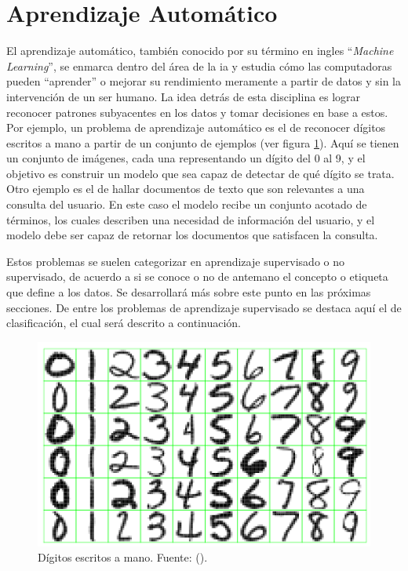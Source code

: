 \section{Aprendizaje Automático}

El aprendizaje automático, también conocido por su término en ingles
“\textit{Machine Learning}”, se enmarca dentro del área de la \acrfull{ia} y
estudia cómo las computadoras pueden “aprender” o mejorar su rendimiento
meramente a partir de datos y sin la intervención de un ser humano.  La idea
detrás de esta disciplina es lograr reconocer patrones subyacentes en los datos
y tomar decisiones en base a estos. Por ejemplo, un problema de aprendizaje
automático es el de reconocer dígitos escritos a mano a partir de un conjunto de
ejemplos (ver figura \ref{fig:reconocimiento_digitos}).  Aquí se tienen un
conjunto de imágenes, cada una representando un dígito del 0 al 9, y el objetivo
es construir un modelo que sea capaz de detectar de qué dígito se trata. Otro
ejemplo es el de hallar documentos de texto que son relevantes a una consulta
del usuario. En este caso el modelo recibe un conjunto acotado de términos, los
cuales describen una necesidad de información del usuario, y el modelo debe ser
capaz de retornar los documentos que satisfacen la consulta.  

Estos problemas se suelen categorizar en aprendizaje supervisado o no
supervisado, de acuerdo a si se conoce o no de antemano el concepto o etiqueta
que define a los datos. Se desarrollará más sobre este punto en las próximas
secciones. De entre los problemas de aprendizaje supervisado se destaca aquí el
de clasificación, el cual será descrito a continuación.

\begin{figure}
   \includegraphics[width=0.66\linewidth]{figures/digits_recognition_v2.png}
   \centering
   \caption{Dígitos escritos a mano. Fuente: 
   (\citeyear{hastie_elements_2009}).}
   \label{fig:reconocimiento_digitos}
\end{figure}

